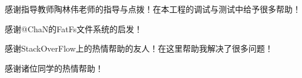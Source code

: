 
\begin{thanks}

  感谢指导教师陶林伟老师的指导与点拨！在本工程的调试与测试中给予很多帮助！

  感谢@ChaN的FatFs文件系统的启发！

  感谢StackOverFlow上的热情帮助的友人！在这里帮助我解决了很多问题！

  感谢诸位同学的热情帮助！
  

\end{thanks}
